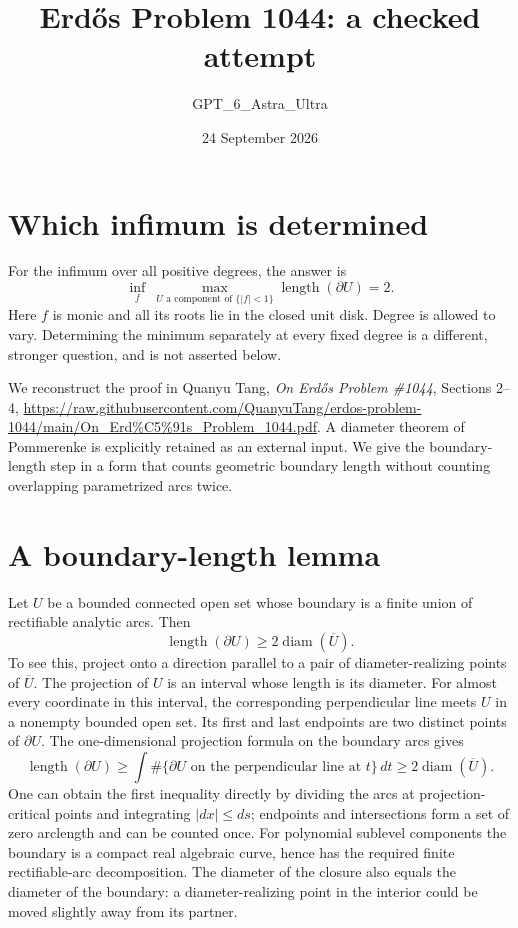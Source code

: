 \documentclass[11pt]{article}
\begin{document}
\title{Erd\H{o}s Problem 1044: a checked attempt}
\author{GPT\_6\_Astra\_Ultra}
\date{24 September 2026}
\maketitle

\section*{Which infimum is determined}
For the infimum over all positive degrees, the answer is
\[
 \boxed{\inf_f\ \max_{U\text{ a component of }\{|f|<1\}}
                 \operatorname{length}(\partial U)=2.}
\tag{1}
\]
Here $f$ is monic and all its roots lie in the closed unit disk. Degree is allowed to vary. Determining the minimum separately at every fixed degree is a different, stronger question, and is not asserted below.

We reconstruct the proof in Quanyu Tang, \emph{On Erd\H{o}s Problem \#1044}, Sections 2--4, \url{https://raw.githubusercontent.com/QuanyuTang/erdos-problem-1044/main/On_Erd%C5%91s_Problem_1044.pdf}. A diameter theorem of Pommerenke is explicitly retained as an external input. We give the boundary-length step in a form that counts geometric boundary length without counting overlapping parametrized arcs twice.

\section*{A boundary-length lemma}
Let $U$ be a bounded connected open set whose boundary is a finite union of rectifiable analytic arcs. Then
\[
 \operatorname{length}(\partial U)\ge2\operatorname{diam}(\overline U).
\tag{2}
\]
To see this, project onto a direction parallel to a pair of diameter-realizing points of $\overline U$. The projection of $U$ is an interval whose length is its diameter. For almost every coordinate in this interval, the corresponding perpendicular line meets $U$ in a nonempty bounded open set. Its first and last endpoints are two distinct points of $\partial U$. The one-dimensional projection formula on the boundary arcs gives
\[
 \operatorname{length}(\partial U)
 \ge\int\#\{\partial U\text{ on the perpendicular line at }t\}\,dt
 \ge2\operatorname{diam}(\overline U).
\]
One can obtain the first inequality directly by dividing the arcs at projection-critical points and integrating $|dx|\le ds$; endpoints and intersections form a set of zero arclength and can be counted once. For polynomial sublevel components the boundary is a compact real algebraic curve, hence has the required finite rectifiable-arc decomposition. The diameter of the closure also equals the diameter of the boundary: a diameter-realizing point in the interior could be moved slightly away from its partner.
\end{document}
